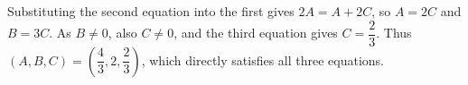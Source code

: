 Substituting the second equation into the first gives $ 2A=A+2C $, so $ A=2C $ and $ B=3C $. As $ B\ne0 $, also $ C\ne0 $, and the third equation gives $ C=\dfrac{2}{3}$. Thus $\boxed{(A,B,C)=(\dfrac{4}{3},2,\dfrac{2}{3})}$, which directly satisfies all three equations.

